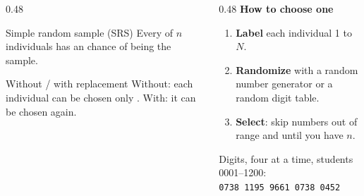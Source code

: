 \documentclass[aspectratio=169, 11pt]{beamer}
\begin{document}
\begin{frame}[t, plain]
  \vspace{2pt}
  \begin{columns}[t]
    \begin{column}{0.48\textwidth}
      \begin{block}{Simple random sample (SRS)}
        Every  of $n$ individuals has an  chance of being the
        sample.
      \end{block}
      \vspace{3pt}
      \begin{block}{Without / with replacement}
        Without: each individual can be chosen only . With: it can be chosen
        again.
      \end{block}
    \end{column}
    \begin{column}{0.48\textwidth}
      {\small\textbf{How to choose one}}
      \begin{enumerate}\setlength{\itemsep}{3pt}\small
        \item \textbf{Label} each individual 1 to $N$.
        \item \textbf{Randomize} with a random number generator or a random digit table.
        \item \textbf{Select}: skip numbers out of range and  until you have
              $n$.
      \end{enumerate}
      \vspace{6pt}
      {\small Digits, four at a time, students 0001--1200:\\
      \texttt{0738 1195 9661 0738 0452}}
    \end{column}
  \end{columns}
\end{frame}
\end{document}
